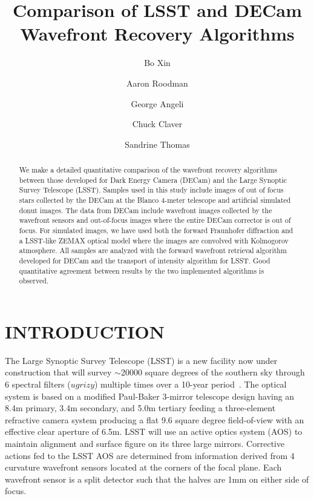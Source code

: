 \documentclass[]{spie}  %
\title{Comparison of LSST and DECam Wavefront Recovery Algorithms}
\author[a]{Bo Xin}
\author[b]{Aaron Roodman}
\author[a]{George Angeli}
\author[a]{Chuck Claver}
\author[a]{Sandrine Thomas}
\affil[a]{Large Synoptic Survey Telescope, Tucson AZ, USA}
\affil[b]{SLAC National Accelerator Laboratory, Stanford University, Menlo Park CA, USA}
\begin{document}
 
\maketitle

\begin{abstract}
We make a detailed quantitative comparison of the wavefront recovery algorithms between those developed for Dark Energy Camera (DECam) and the Large Synoptic Survey Telescope (LSST).
Samples used in this study include images of out of focus stars collected by the DECam at the Blanco 4-meter telescope and artificial simulated donut images. 
The data from DECam include wavefront images collected by the wavefront sensors and out-of-focus images where the entire DECam corrector is out of focus. For simulated images, we have used both the forward Fraunhofer diffraction and a LSST-like ZEMAX optical model where the images are convolved with Kolmogorov atmosphere.
All samples are analyzed with the forward wavefront retrieval algorithm developed for DECam and the transport of intensity algorithm for LSST.  Good quantitative agreement between results by the two implemented algorithms is observed.
\end{abstract}


\section{INTRODUCTION}
\label{sec:intro}  %
The Large Synoptic Survey Telescope (LSST) is a new facility now under
construction that will survey $\sim$20000 square degrees of the
southern sky through 6 spectral filters ($ugrizy$) multiple times over
a 10-year period~\cite{KahnSPIE, Ivezic08}.
The optical system is
based on a modified Paul-Baker 3-mirror
telescope design having an 8.4m primary, 3.4m secondary, and 5.0m
tertiary feeding a three-element refractive camera system producing a
flat 9.6 square degree field-of-view with an effective clear aperture of
6.5m. 
LSST will use an active optics
system (AOS) to maintain alignment and surface figure on its
three large mirrors. Corrective actions fed to the LSST AOS are
determined from information derived from 4 curvature wavefront sensors located at the
corners of the focal plane. Each wavefront sensor is a split detector such that the halves
are 1mm on either side of focus. 
\end{document}
